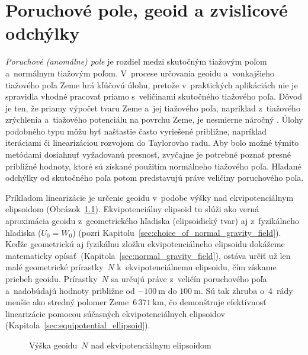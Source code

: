 \documentclass[a4paper,12pt]{book}
\begin{document}

\chapter{Poruchové pole, geoid a zvislicové odchýlky}
\label{sec:disturbing_field_geoid_deflections}

\emph{Poruchové (anomálne) pole} je rozdiel medzi skutočným tiažovým poľom 
a~normálnym tiažovým poľom.  V~procese určovania geoidu a~vonkajšieho tiažového 
poľa Zeme hrá kľúčovú úlohu, pretože v~praktických aplikáciách nie je spravidla 
vhodné pracovať priamo s~veličinami skutočného tiažového poľa.  Dôvod je ten, 
že priamy výpočet tvaru Zeme a~jej tiažového poľa, napríklad z~tiažového 
zrýchlenia a~tiažového potenciálu na povrchu Zeme, je nesmierne náročný 
\parencite[pozri napríklad][]{Hormander1976,SansoGeodeticBoundaryValueProblem}.  
Úlohy podobného typu môžu byť našťastie často vyriešené približne, napríklad 
iteráciami či linearizáciou rozvojom do Taylorovho radu.  Aby bolo možné týmito 
metódami dosiahnuť vyžadovanú presnosť, zvyčajne je potrebné poznať presné 
približné hodnoty, ktoré sú získané použitím normálneho tiažového poľa.  
Hľadané odchýlky od skutočného poľa potom predstavujú práve veličiny 
poruchového poľa.

Príkladom linearizácie je určenie geoidu v~podobe výšky nad ekvipotenciálnym 
elipsoidom (Obrázok~\ref{fig:geoid}).  Ekvipotenciálny elipsoid tu slúži ako 
verná aproximácia geoidu z~geometrického hľadiska (elipsoidický tvar) aj 
z~fyzikálneho hľadiska ($U_0 = W_0$) (pozri 
Kapitolu~\ref{sec:choice_of_normal_gravity_field}).  Keďže geometrickú aj 
fyzikálnu zložku ekvipotenciálneho elipsoidu dokážeme matematicky 
opísať~(Kapitola~\ref{sec:normal_gravity_field}), ostáva určiť už len malé 
geometrické prírastky~$N$ k~ekvipotenciálnemu elipsoidu, čím získame priebeh 
geoidu.  Prírastky~$N$ sa určujú práve z~veličín poruchového poľa a~nadobúdajú 
hodnoty približne od $-100\ \mathrm{m}$ do $100\ \mathrm{m}$.  Sú tak zhruba 
o~4~rády menšie ako stredný polomer Zeme~$6\, 371\ \mathrm{km}$, čo demonštruje 
efektívnosť linearizácie pomocou súčasných ekvipotenciálnych elipsoidov 
(Kapitola~\ref{sec:equipotential_ellipsoid}).

\begin{figure}[bt]
\centering

\caption{Výška geoidu~$N$ nad ekvipotenciálnym elipsoidom}
\label{fig:geoid}
\end{figure}
\end{document}

